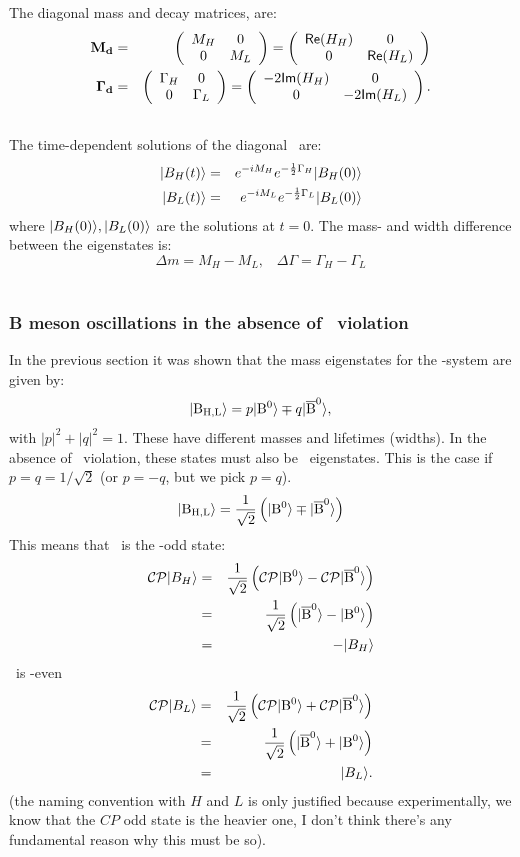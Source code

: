 The diagonal mass and decay matrices,
 are:
\begin{eqnarray}
\mathbf{M_d}&=& \left( \begin{array}{cc} M_H & 0 \\ 0 & M_L \end{array} \right)
        = \left( \begin{array}{cc} \mathsf{Re}\!\left(H_H\right) & 0 \\ 0 & \mathsf{Re}\!\left(H_L\right) \end{array} \right)\\
\mathbf{\Gamma_d}&=& \left( \begin{array}{cc} \Gamma_H & 0 \\ 0 & \Gamma_L \end{array} \right) 
             = \left( \begin{array}{cc} -2\mathsf{Im}\!\left(H_H\right) & 0 \\ 0 & -2\mathsf{Im}\!\left(H_L\right) \end{array} \right)
.
\nonumber\\
\mbox{}
\end{eqnarray}
 The time-dependent solutions of the diagonal \Se\ are:
 \begin{eqnarray}
  | B_H(t) \rangle &=& e^{-iM_H} e^{-\frac{1}{2}\Gamma_H}  | B_H(0) \rangle \nonumber\\
  | B_L(t) \rangle &=& e^{-iM_L} e^{-\frac{1}{2}\Gamma_L}  | B_L(0) \rangle \nonumber\\
 \end{eqnarray}
 where $ | B_H(0) \rangle,  | B_L(0) \rangle$ are the solutions at $t=0$.
 The mass- and width difference between the eigenstates is:
\begin{equation}
\Delta\!m = M_H-M_L, \;\;\;
\Delta\!\Gamma=\Gamma_H-\Gamma_L
\end{equation}\\

\subsubsection{B meson oscillations in the absence of \cp\ violation}
\label{sec:bosc}
 In the previous section it was shown that the mass eigenstates
 for the \Bo-system are given by:
\begin{equation}
\label{eq:th.a.def_Bl_Bh}
 | {\rm B_{H,L}} \rangle = p  | {\rm B^0} \rangle \mp q  | {\rm \overline{B}^0} \rangle,
\end{equation}
with $|p|^2 + |q|^2 = 1$. 
These have different masses and lifetimes (widths). In the absence of \cp\ violation, these states must also be \cp\  eigenstates. This is the case if $p=q=1/\sqrt{2}$ (or $p=-q$, but we pick $p=q$). 
\begin{equation}
\label{eq:th.a.def_Bl_Bh}
 | {\rm B_{H,L}} \rangle = \frac{1}{\sqrt{2}} \left(  | {\rm B^0} \rangle \mp  | {\rm \overline{B}^0} \rangle\right)
\end{equation}
This means that \Bh\ is the \cp-odd state:
\begin{eqnarray}
\mathcal{CP}  | B_H \rangle & = & \frac{1}{\sqrt{2}} \left( \mathcal{CP}  | {\rm B^0} \rangle - \mathcal{CP}  | {\rm \overline{B}^0} \rangle\right) \nonumber\\
& = & \frac{1}{\sqrt{2}} \left(  | {\rm \overline{B}^0} \rangle -  | {\rm B^0} \rangle\right) \nonumber\\
& = & -  | B_H \rangle
\end{eqnarray}
\Bl\ is \cp-even
\begin{eqnarray}
\mathcal{CP}  | B_L \rangle & = & \frac{1}{\sqrt{2}} \left( \mathcal{CP}  | {\rm B^0} \rangle + \mathcal{CP}  | {\rm \overline{B}^0} \rangle\right) \nonumber\\
& = & \frac{1}{\sqrt{2}} \left(  | {\rm \overline{B}^0} \rangle +  | {\rm B^0} \rangle\right) \nonumber\\
& = &  | B_L \rangle.
\end{eqnarray}
(the naming convention with $H$ and $L$ is only justified because experimentally, we know that the $CP$ odd state is the heavier one, I don't think there's any fundamental reason why this must be so).


